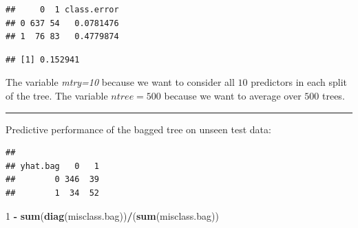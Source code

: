 \documentclass[]{article}
\newenvironment{Shaded}{\begin{snugshade}}{\end{snugshade}}
\newcommand{\DataTypeTok}[1]{\textcolor[rgb]{0.13,0.29,0.53}{#1}}
\newcommand{\DecValTok}[1]{\textcolor[rgb]{0.00,0.00,0.81}{#1}}
\newcommand{\KeywordTok}[1]{\textcolor[rgb]{0.13,0.29,0.53}{\textbf{#1}}}
\newcommand{\NormalTok}[1]{#1}
\newcommand{\OperatorTok}[1]{\textcolor[rgb]{0.81,0.36,0.00}{\textbf{#1}}}
\newcommand{\StringTok}[1]{\textcolor[rgb]{0.31,0.60,0.02}{#1}}
\begin{document}
\begin{verbatim}
##     0  1 class.error
## 0 637 54   0.0781476
## 1  76 83   0.4779874
\end{verbatim}

\begin{Shaded}
\end{Shaded}

\begin{verbatim}
## [1] 0.152941
\end{verbatim}

\normalsize

The variable \emph{mtry=10} because we want to consider all \(10\)
predictors in each split of the tree. The variable \(ntree=500\) because
we want to average over \(500\) trees.

\begin{center}\rule{0.5\linewidth}{\linethickness}\end{center}

Predictive performance of the bagged tree on unseen test data:

\begin{Shaded}
\end{Shaded}

\begin{verbatim}
##         
## yhat.bag   0   1
##        0 346  39
##        1  34  52
\end{verbatim}

\begin{Shaded}
\begin{Highlighting}[]
\DecValTok{1} \OperatorTok{-}\StringTok{ }\KeywordTok{sum}\NormalTok{(}\KeywordTok{diag}\NormalTok{(misclass.bag))}\OperatorTok{/}\NormalTok{(}\KeywordTok{sum}\NormalTok{(misclass.bag))}
\end{Highlighting}
\end{Shaded}
\end{document}
